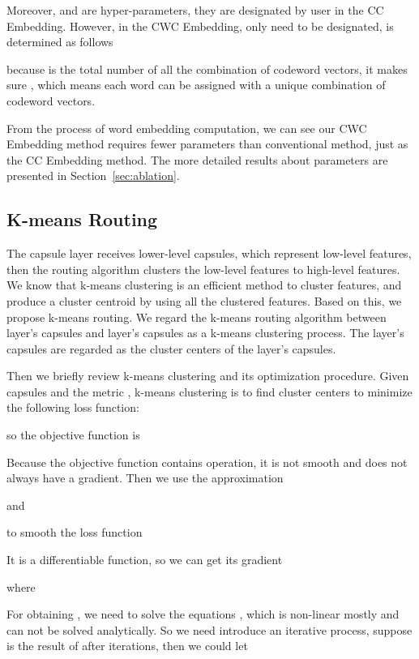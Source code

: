 \documentclass[times,twocolumn,final]{elsarticle}
\begin{document}
Moreover,  and  are hyper-parameters, they are designated by user in the CC Embedding. However, in the CWC Embedding, only  need to be designated,  is determined as follows
    
because  is the total number of all the combination of codeword vectors, it makes sure , which means each word can be assigned with a unique combination of codeword vectors.

From the process of word embedding computation, we can see our CWC Embedding method requires fewer parameters than conventional method, just as the CC Embedding method. The more detailed results about parameters are presented in Section~\ref{sec:ablation}.

\subsection{K-means Routing}
\label{sec:k_means}

The capsule layer receives lower-level capsules, which represent low-level features, then the routing algorithm clusters the low-level features to high-level features. We know that k-means clustering is an efficient method to cluster features, and produce a cluster centroid by using all the clustered features. Based on this, we propose k-means routing. We regard the k-means routing algorithm between  layer's capsules and  layer's capsules as a k-means clustering process. The  layer's capsules are regarded as the cluster centers of the  layer's capsules.

Then we briefly review k-means clustering and its optimization procedure. Given  capsules  and the metric , k-means clustering is to find  cluster centers  to minimize the following loss function:
    
so the objective function is
    
Because the objective function contains  operation, it is not smooth and does not always have a gradient. Then we use the approximation~\cite{cook2011basic}
    
and
    
to smooth the loss function
    
It is a differentiable function, so we can get its gradient
    
where
	

For obtaining , we need to solve the equations , which is non-linear mostly and can not be solved analytically. So we need introduce an iterative process, suppose  is the result of  after  iterations, then we could let
    
\end{document}
